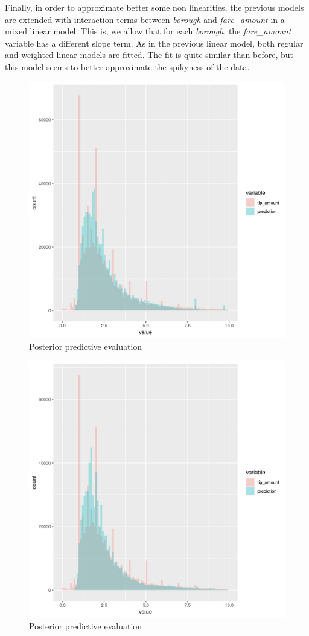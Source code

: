 \documentclass[11pt]{article}
\begin{document}
Finally, in order to approximate better some non linearities, the
previous models are extended with interaction terms between \emph{borough}
and \emph{fare\_amount} in a mixed linear model. This is, we allow that for
each \emph{borough}, the \emph{fare\_amount} variable has a different slope term.
As in the previous linear model, both regular and weighted linear models
are fitted. The fit is quite similar than before, but this model seems
to better approximate the spikyness of the data.

\begin{figure}[htbp]
\centering
\includegraphics[width=.9\linewidth]{./plots/evaluation4PosteriorPredictive.jpg}
\caption{\label{fig:orga831bca}
Posterior predictive evaluation}
\end{figure}

\begin{figure}[htbp]
\centering
\includegraphics[width=.9\linewidth]{./plots/evaluation5PosteriorPredictive.jpg}
\caption{\label{fig:orge13f084}
Posterior predictive evaluation}
\end{figure}
\end{document}

